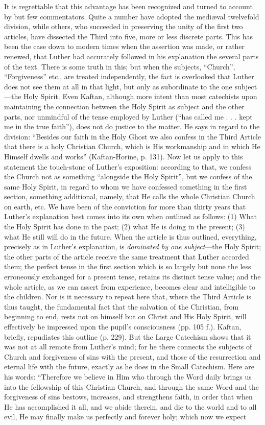 It is regrettable that this advantage has been recognized and turned to account by but few commentators. Quite a number have adopted the mediæval twelvefold division, while others, who succeeded in preserving the unity of the first two articles, have dissected the Third into five, more or less discrete parts. This has been the case down to modern times when the assertion was made, or rather renewed, that Luther had accurately followed in his explanation the several parts of the text. There is some truth in this; but when the subjects, “Church”, “Forgiveness” etc., are treated independently, the fact is overlooked
that Luther does not see them at all in that light, but only as subordinate to the one subject—the Holy Spirit. Even Kaftan, although more intent than most catechists upon maintaining the connection between the Holy Spirit as subject and the other parts, nor unmindful of the tense employed by Luther (“has called me . . . kept me in the true faith”), does not do justice to the matter. He says in regard to the division: “Besides our faith in the Holy Ghost we also confess in the Third Article that there is a holy Christian Church, which is His workmanship and in which He Himself dwells and works” (Kaftan-Horine, p. 131). Now let us apply to this statement the touch-stone of Luther’s exposition: according to that, we confess the Church not as something “alongside the Holy Spirit”, but we confess of the same Holy Spirit, in regard to whom we have confessed something in the first section, something additional, namely, that He calls the whole Christian Church on earth, etc. We have been of the conviction for more than thirty years that Luther’s explanation best comes into its own when outlined as follows: (1) What the Holy Spirit has done in the past; (2) what He is doing in the present; (3) what He still will do in the future. When the article is thus outlined, everything, precisely as in Luther’s explanation, is \emph{dominated by one subject}—the Holy Spirit; the other parts of the article receive the same treatment that Luther accorded them; the perfect tense in the first section which is so largely but none the less erroneously exchanged for a present tense, retains its distinct tense value; and the whole article, as we can assert from experience, becomes clear and intelligible to the children. Nor is it necessary to repeat here that, where the Third Article is thus taught, the fundamental fact that the salvation of the Christian, from beginning to end, rests not on himself but on Christ and His Holy Spirit, will effectively be impressed upon the pupil’s consciousness (pp. 105 f.). Kaftan, briefly, repudiates this outline (p. 229). But the Large Catechism shows that it was not at all remote from Luther’s mind; for he there connects the subjects of Church and forgiveness of sins with the present, and those of the resurrection and eternal life with the future, exactly as he does in the Small Catechism. Here are his words: “Therefore we believe in Him who through the Word daily brings us into the fellowship of this Christian Church, and through the same Word and the forgiveness of sins bestows, increases, and strengthens faith, in order that when He has accomplished it all, and we abide therein, and die to the world and to all evil, He may finally make us perfectly and forever holy; which now we expect
